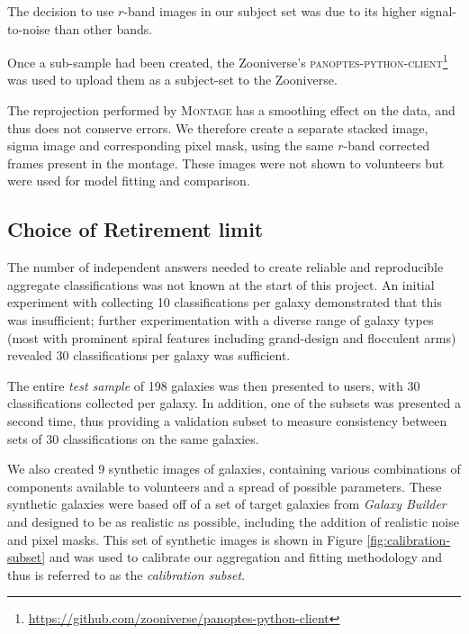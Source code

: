 \documentclass[trackchanges]{aastex63}
\begin{document}
The decision to use $r$-band images in our subject set was due to its higher signal-to-noise than other bands.

Once a sub-sample had been created, the Zooniverse's \textsc{panoptes-python-client}\footnote{\url{https://github.com/zooniverse/panoptes-python-client}} was used to upload them as a subject-set to the Zooniverse.

The reprojection performed by \textsc{Montage} has a smoothing effect on the data, and thus does not conserve errors. We therefore create a separate stacked image, sigma image and corresponding pixel mask, using the same $r$-band corrected frames present in the montage. These images were not shown to volunteers but were used for model fitting and comparison.

\subsection{Choice of Retirement limit}
\label{sec:retirement-limit}

The number of independent answers needed to create reliable and reproducible aggregate classifications was not known at the start of this project. An initial experiment with collecting 10 classifications per galaxy demonstrated that this was insufficient; further experimentation with a diverse range of galaxy types (most with prominent spiral features including grand-design and flocculent arms) revealed 30 classifications per galaxy was sufficient.

The entire {\it test sample} of 198 galaxies was then presented to users, with 30 classifications collected per galaxy. In addition, one of the subsets was presented a second time, thus providing a validation subset to measure consistency between sets of 30 classifications on the same galaxies.

We also created 9 synthetic images of galaxies, containing various combinations of components available to volunteers and a spread of possible parameters. These synthetic galaxies were based off of a set of target galaxies from \textit{Galaxy Builder} and designed to be as realistic as possible, including the addition of realistic noise and pixel masks. This set of synthetic images is shown in Figure \ref{fig:calibration-subset} and was used to calibrate our aggregation and fitting methodology and thus is referred to as the \textit{calibration subset}.

\begin{figure*}
  \caption{Arcsinh-stretched images of the synthetic galaxies present in the \textit{calibration subset}. These galaxies were designed to look as realistic as possible, while being described perfectly by the model available to volunteers.}
  \label{fig:calibration-subset}
\end{figure*}
\end{document}
